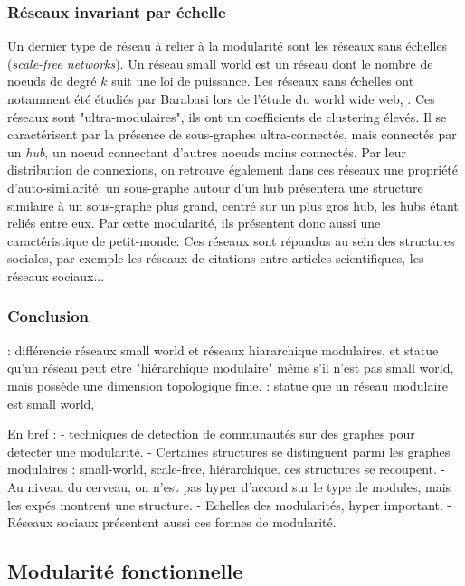 \subsubsection{Réseaux invariant par échelle}

Un dernier type de réseau à relier à la modularité sont les réseaux sans échelles (\emph{scale-free networks}). Un réseau small world est un réseau dont le nombre de noeuds de degré $k$ suit une loi de puissance. Les réseaux sans échelles ont notamment été étudiés par Barabasi lors de l'étude du world wide web, \cite{Barabasi2003ScaleFreeN}.
Ces réseaux sont "ultra-modulaires", ils ont un coefficients de clustering élevés. Il se caractérisent par la présence de sous-graphes ultra-connectés, mais connectés par un \emph{hub}, un noeud connectant d'autres noeuds moins connectés. Par leur distribution de connexions, on retrouve également dans ces réseaux une propriété d'auto-similarité: un sous-graphe autour d'un hub présentera une structure similaire à un sous-graphe plus grand, centré sur un plus gros hub, les hubs étant reliés entre eux. Par cette modularité, ils présentent donc aussi une caractéristique de petit-monde. Ces réseaux sont répandus au sein des structures sociales, par exemple les réseaux de citations entre articles scientifiques, les réseaux sociaux...

\subsubsection{Conclusion}


\cite{Hilgetag2015IsTB} : différencie réseaux small world et réseaux hiararchique modulaires, et statue qu'un réseau peut etre "hiérarchique modulaire" même s'il n'est pas small world, mais possède une dimension topologique finie. 
\cite{Meunier2010ModularAH} : statue que un réseau modulaire est small world,


En bref : 
- techniques de detection de communautés sur des graphes pour detecter une modularité.
- Certaines structures se distinguent parmi les graphes modulaires :  small-world, scale-free, hiérarchique. ces structures se recoupent.
- Au niveau du cerveau, on n'est pas hyper d'accord sur le type de modules, mais les expés montrent une structure. 
- Echelles des modularités, hyper important.
- Réseaux sociaux présentent aussi ces formes de modularité. 

\subsection{Modularité fonctionnelle}

